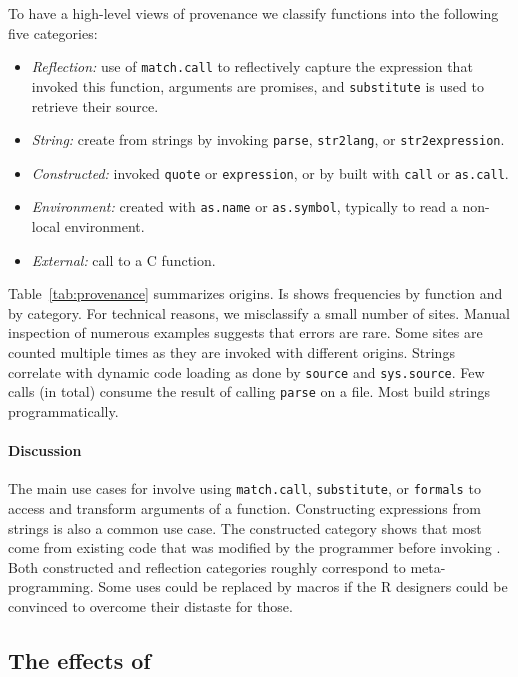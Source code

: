 \documentclass[screen,acmsmall]{acmart}%
\renewcommand{\k}[1]{\lstinline |#1|\xspace}
\begin{document}
To have a high-level views of provenance we classify functions into the
following five categories:

\begin{itemize}[---]
\item {\it Reflection:} use of \k{match.call} to reflectively capture the
  expression that invoked this function, arguments are promises, and
  \k{substitute} is used to retrieve their source.
\item {\it String:} create from strings by invoking \k{parse},
  \k{str2lang}, or \k{str2expression}.
\item {\it Constructed:} invoked \k{quote} or \k{expression}, or by built with
  \k{call} or \k{as.call}.
\item {\it Environment: } created with \k{as.name} or \k{as.symbol}, typically
  to read a non-local environment.
\item {\it External: }  call to a C function. %
\end{itemize}

Table~\ref{tab:provenance} summarizes origins. Is shows frequencies by function
and by category. For technical reasons, we misclassify a small number of sites.
Manual inspection of numerous examples suggests that errors are rare. Some sites
are counted multiple times as they are invoked with different origins. Strings
correlate with dynamic code loading as done by \k{source} and \k{sys.source}.
Few calls (\packageNbParseFromFileSites in total) consume the result of calling
\k{parse} on a file. Most build strings programmatically.


\paragraph{Discussion}
The main use cases for \eval involve using \k{match.call}, \k{substitute}, or
\k{formals} to access and transform arguments of a function. Constructing
expressions from strings is also a common use case. The constructed category
shows that most \evals come from existing code that was modified by the
programmer before invoking \eval. Both constructed and reflection categories
roughly correspond to meta-programming. Some uses could be replaced by
macros if the R designers could be convinced to overcome their distaste for
those.

\subsection{The effects of \eval}
\end{document}
